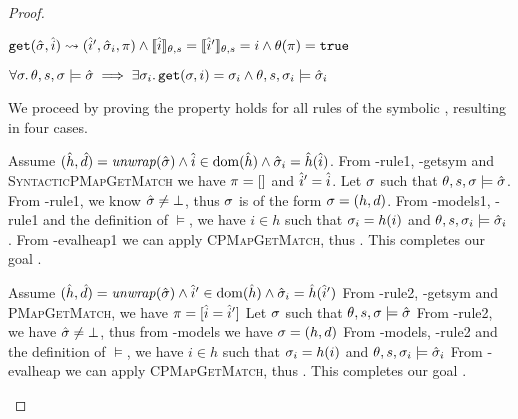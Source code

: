 \begin{proof}


\pfassume \begin{hypvlist}
 $\texttt{get}(\hat{\sigma},\hat{i})\rightsquigarrow(\hat{i}', \hat{\sigma}_i, \pi) \land \llbracket\hat{i}\rrbracket_{\theta,s}=\llbracket\hat{i}'\rrbracket_{\theta,s}=i \land \theta(\pi)=\texttt{true} $
\end{hypvlist}
\pfprove \begin{goalvlist}
 $\forall \sigma\ldotp \theta,s,\sigma \models \hat{\sigma} \implies \exists \sigma_i \ldotp \texttt{get}(\sigma, i)=\sigma_i \land \theta,s,\sigma_i \models \hat{\sigma}_i$
\end{goalvlist}

We proceed by proving the property holds for all rules of the symbolic , resulting in four cases.


\begin{hypvlist}
 Assume $(\hat{h}, \hat{d})={\operatorname{\mathit{unwrap}}}(\hat{\sigma}) \land \hat{i}\in\operatorname{dom}(\hat{h}) \land \hat{\sigma}_i=\hat{h}(\hat{i})$.
 From \hyp{rule1}, \hyp{getsym} and \textsc{SyntacticPMapGetMatch} we have $\pi=[]$ and $\hat{i}'=\hat{i}$.
 Let $\sigma$ such that $\theta,s,\sigma\models\hat{\sigma}$.
 From \hyp{rule1}, we know $\hat{\sigma}\neq\bot$, thus $\sigma$ is of the form $\sigma=(h,d)$.
 From \hyp{models1}, \hyp{rule1} and the definition of $\models$, we have $i\in h$ such that $\sigma_i=h(i)$ and ${\theta,s,\sigma_i\models\hat{\sigma}_i}$.
 From \hyp{evalheap1} we can apply \textsc{CPMapGetMatch}, thus . This completes our goal .
\end{hypvlist}


\begin{hypvlist}
 Assume $(\hat{h},\hat{d})={\operatorname{\mathit{unwrap}}}(\hat{\sigma}) \land \hat{i}'\in\operatorname{dom}(\hat{h}) \land \hat{\sigma}_i=\hat{h}(\hat{i}')$
 From \hyp{rule2}, \hyp{getsym} and \textsc{PMapGetMatch}, we have $\pi=[\hat{i}=\hat{i}']$
 Let $\sigma$ such that $\theta,s,\sigma\models\hat{\sigma}$
 From \hyp{rule2}, we have $\hat{\sigma}\neq\bot$, thus from \hyp{models} we have $\sigma=(h, d)$
 From \hyp{models}, \hyp{rule2} and the definition of $\models$, we have $i\in h$ such that $\sigma_i=h(i)$ and ${\theta,s,\sigma_i\models\hat{\sigma}_i}$
 From \hyp{evalheap} we can apply \textsc{CPMapGetMatch}, thus . This completes our goal .
\end{hypvlist}


\end{proof}
